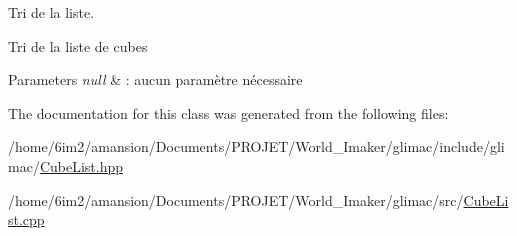 Tri de la liste. 

Tri de la liste de cubes


\begin{DoxyParams}{Parameters}
{\em null} & \+: aucun paramètre nécessaire \\
\hline
\end{DoxyParams}


The documentation for this class was generated from the following files\+:\begin{DoxyCompactItemize}
\item 
/home/6im2/amansion/\+Documents/\+P\+R\+O\+J\+E\+T/\+World\+\_\+\+Imaker/glimac/include/glimac/\hyperlink{CubeList_8hpp}{Cube\+List.\+hpp}\item 
/home/6im2/amansion/\+Documents/\+P\+R\+O\+J\+E\+T/\+World\+\_\+\+Imaker/glimac/src/\hyperlink{CubeList_8cpp}{Cube\+List.\+cpp}\end{DoxyCompactItemize}
